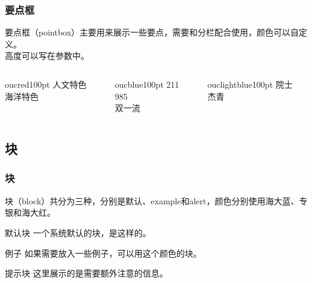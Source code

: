 \documentclass[aspectratio=169,UTF8,t]{beamer}%
\begin{document}
\begin{frame}
    \frametitle{要点框}
    要点框（pointbox）主要用来展示一些要点，需要和分栏配合使用，颜色可以自定义。 \\   
    高度可以写在参数中。  
      \begin{columns}
        \begin{column}{0.3\textwidth}
            \begin{pointbox}[要点一]{oucred}{100pt}
                人文特色\\
                海洋特色\\                
            \end{pointbox}
        \end{column}
        \begin{column}{0.3\textwidth}
            \begin{pointbox}[要点二]{oucblue}{100pt}
                211\\
                985\\
                双一流 
            \end{pointbox}            
        \end{column}
        \begin{column}{0.3\textwidth}
            \begin{pointbox}[要点三]{ouclightblue}{100pt}
                院士\\
                杰青 
            \end{pointbox}
        \end{column}
    \end{columns}    
\end{frame}

\subsection{块}

\begin{frame}
    \frametitle{块}
    块（block）共分为三种，分别是默认、example和alert，颜色分别使用海大蓝、专银和海大红。
    \begin{block}{默认块}
        一个系统默认的块，是这样的。
    \end{block}

    \begin{exampleblock}{例子}
        如果需要放入一些例子，可以用这个颜色的块。
    \end{exampleblock}

    \begin{alertblock}{提示块}
        这里展示的是需要额外注意的信息。
    \end{alertblock}
\end{frame}
\end{document}

